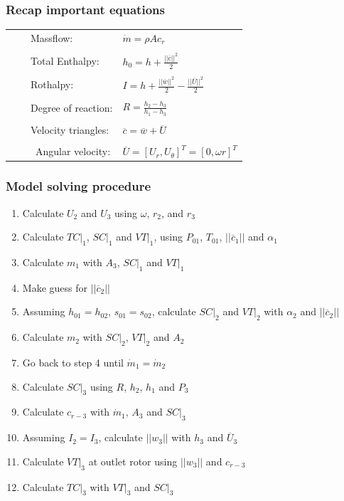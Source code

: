 \documentclass{beamer}
\newcommand{\tabitem}{~~\llap{\textbullet}~~}
\begin{document}
\begin{frame}
	\frametitle{Recap important equations }
	\begin{tabular}{ll} 
 		{\tabitem Massflow:} & $\dot{m}=\rho A c_r$ \\ \\ 
       {\tabitem Total Enthalpy:} & $h_0 = h + \frac{||\overline{c}||^2}{2}$ \\ \\
	   {\tabitem Rothalpy:} & $I = h + \frac{||\overline{w}||^2}{2} - \frac{||\overline{U}||^2}{2}$ \\ \\
	   {\tabitem Degree of reaction:} & $R = \frac{h_2-h_3}{h_1-h_3}$ \\ \\
	   {\tabitem Velocity triangles:} & $\overline{c} = \overline{w} + \overline{U}$ \\ \\\
	   {\tabitem Angular velocity:} & $\overline{U}= [U_r, U_\theta]^T = [0 , \omega r]^T$ 
     \end{tabular}
\end{frame}


\begin{frame}
	\frametitle{Model solving procedure }

\begin{enumerate}
	\item Calculate $U_2$ and $U_3$ using $\omega$, $r_2$, and $r_3$
	\item Calculate $TC|_1$, $SC|_1$ and $VT|_1$, using $P_{01}$, $T_{01}$, $||\overline c_1||$ and $\alpha_1$ 
	\item Calculate $m_1$ with $A_3$, $SC|_1$ and $VT|_1$

	\bigskip
	\item Make guess for $||\overline c_2||$
	\item Assuming $h_{01}=h_{02}$, $s_{01}=s_{02}$, calculate $SC|_2$ and $VT|_2$ with $\alpha_2$ and $||\overline c_2||$
	\item Calculate $m_2$ with $SC|_2$, $VT|_2$ and $A_2$
	\item Go back to step 4 until $\dot{m}_1 =\dot{m}_2$
	\bigskip


	\item Calculate $SC|_3$ using $R$, $h_2$, $h_1$ and $P_3$ 
	\item Calculate $c_{r-3}$ with $\dot{m}_1$, $A_3$ and $SC|_3$
	\item Assuming $I_2=I_3$, calculate $||w_3||$ with $h_3$ and $\overline{U}_3$ 
	\item Calculate $VT|_3$ at outlet rotor using $||w_3||$ and $c_{r-3}$
	\item Calculate $TC|_3$ with $VT|_3$ and $SC|_3$ 
\end{enumerate}
\end{frame}
\end{document}
